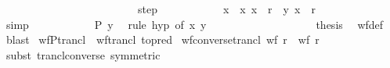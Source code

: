 \begin{isabellebody}
\ \ \ \ \ \ \ \ \isamarkupfalse%
\isanewline
\ \ \ \ \ \ \isamarkupfalse%
\isanewline
\ \ \ \ \ \ \ \ \isamarkupfalse%
\ step\isanewline
\ \ \ \ \ \ \ \ \isamarkupfalse%
\ \isamarkupfalse%
\ x{\isacharprime}{\kern0pt}\ \ {\isachardoublequoteopen}{\isacharparenleft}{\kern0pt}x{\isacharprime}{\kern0pt}{\isacharcomma}{\kern0pt}\ x{\isacharparenright}{\kern0pt}\ {\isasymin}\ r{\isachardoublequoteclose}\ \ {\isachardoublequoteopen}{\isacharparenleft}{\kern0pt}y{\isacharcomma}{\kern0pt}\ x{\isacharprime}{\kern0pt}{\isacharparenright}{\kern0pt}\ {\isasymin}\ r\isactrlsup {\isacharplus}{\kern0pt}{\isachardoublequoteclose}\isanewline
\ \ \ \ \ \ \ \ \ \ \isamarkupfalse%
\ simp\isanewline
\ \ \ \ \ \ \ \ \isamarkupfalse%
\ \isamarkupfalse%
\ {\isachardoublequoteopen}P\ y{\isachardoublequoteclose}\ \isamarkupfalse%
\ {\isacharparenleft}{\kern0pt}rule\ hyp\ {\isacharbrackleft}{\kern0pt}of\ x{\isacharprime}{\kern0pt}\ y{\isacharbrackright}{\kern0pt}{\isacharparenright}{\kern0pt}\isanewline
\ \ \ \ \ \ \isamarkupfalse%
\isanewline
\ \ \ \ \isamarkupfalse%
\isanewline
\ \ \isamarkupfalse%
\isanewline
\ \ \isamarkupfalse%
\ \isamarkupfalse%
\ {\isacharquery}{\kern0pt}thesis\ \isamarkupfalse%
\ wf{\isacharunderscore}{\kern0pt}def\ \isamarkupfalse%
\ blast\isanewline
{}\isamarkupfalse%
%
\endisatagproof
{\isafoldproof}%
%
\isadelimproof
\isanewline
%
\endisadelimproof
\isanewline
{}\isamarkupfalse%
\ wfP{\isacharunderscore}{\kern0pt}trancl\ {\isacharequal}{\kern0pt}\ wf{\isacharunderscore}{\kern0pt}trancl\ {\isacharbrackleft}{\kern0pt}to{\isacharunderscore}{\kern0pt}pred{\isacharbrackright}{\kern0pt}\isanewline
\isanewline
{}\isamarkupfalse%
\ wf{\isacharunderscore}{\kern0pt}converse{\isacharunderscore}{\kern0pt}trancl{\isacharcolon}{\kern0pt}\ {\isachardoublequoteopen}wf\ {\isacharparenleft}{\kern0pt}r{\isasyminverse}{\isacharparenright}{\kern0pt}\ {\isasymLongrightarrow}\ wf\ {\isacharparenleft}{\kern0pt}{\isacharparenleft}{\kern0pt}r\isactrlsup {\isacharplus}{\kern0pt}{\isacharparenright}{\kern0pt}{\isasyminverse}{\isacharparenright}{\kern0pt}{\isachardoublequoteclose}\isanewline
%
\isadelimproof
\ \ %
\endisadelimproof
%
\isatagproof
{}\isamarkupfalse%
\ {\isacharparenleft}{\kern0pt}subst\ trancl{\isacharunderscore}{\kern0pt}converse\ {\isacharbrackleft}{\kern0pt}symmetric{\isacharbrackright}{\kern0pt}{\isacharparenright}{\kern0pt}\isanewline

\end{isabellebody}
